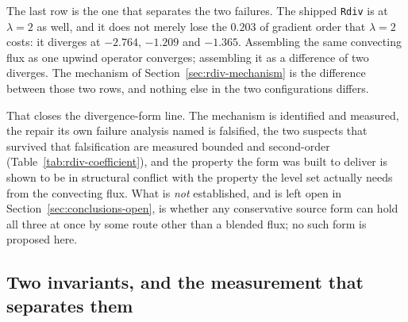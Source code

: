 \documentclass[preprint,3p,11pt]{elsarticle}
\begin{document}
The last row is the one that separates the two failures. The shipped
\texttt{Rdiv} is at $\lambda = 2$ as well, and it does not merely lose the
$0.203$ of gradient order that $\lambda=2$ costs: it diverges at $-2.764$,
$-1.209$ and $-1.365$. Assembling the same convecting flux as one upwind operator
converges; assembling it as a difference of two diverges. The mechanism of
Section~\ref{sec:rdiv-mechanism} is the difference between those two rows, and
nothing else in the two configurations differs.

\medskip
\noindent{}
\medskip

That closes the divergence-form line. The mechanism is identified and measured,
the repair its own failure analysis named is falsified, the two suspects that
survived that falsification are measured bounded and second-order
(Table~\ref{tab:rdiv-coefficient}), and the property the form was built to deliver
is shown to be in structural conflict with the property the level set actually
needs from the convecting flux. What is \emph{not} established, and is left open
in Section~\ref{sec:conclusions-open}, is whether any conservative source form can
hold all three at once by some route other than a blended flux; no such form is
proposed here.

\subsection{Two invariants, and the measurement that separates them}
\label{sec:budget}
\end{document}
